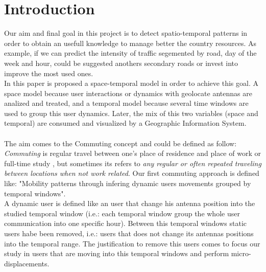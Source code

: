 \newpage
\setcounter{secnumdepth}{1}
\section{Introduction}
Our aim and final goal in this project is to detect spatio-temporal patterns in order to obtain an usefull knowledge to manage better the country resources. As example, if we can predict the intensity of traffic segemented by road, day of the week and hour, could be suggested anothers secondary roads or invest into improve the most used ones.
\\
In this paper is proposed a space-temporal model in order to achieve this goal. A space model because user interactions or dynamics with geolocate antennas are analized and treated, and a temporal model because several time windows are used to group this user dynamics. Later, the mix of this two variables (space and temporal) are consumed and visualized by a Geographic Information System.
\\
\\
The aim comes to the Commuting concept and could be defined as follow: \emph{Commuting} is regular travel between one's place of residence and place of work or full-time study \citep{wiki:commuting}, but  sometimes its refers to \emph{any regular or often repeated traveling between locations when not work related}. Our first commuting approach is defined like: "Mobility patterns through infering dynamic users movements grouped by temporal windows". 
\\
A dynamic user is defined like an user that change his antenna position into the studied temporal window (i.e.: each temporal window group the whole user communication into one specific hour). Between this temporal windows static users habe been removed, i.e.: users that does not change its antennas positions into the temporal range. The justification to remove this users comes to focus our study in users that are moving into this temporal windows and perform micro-displacements.
